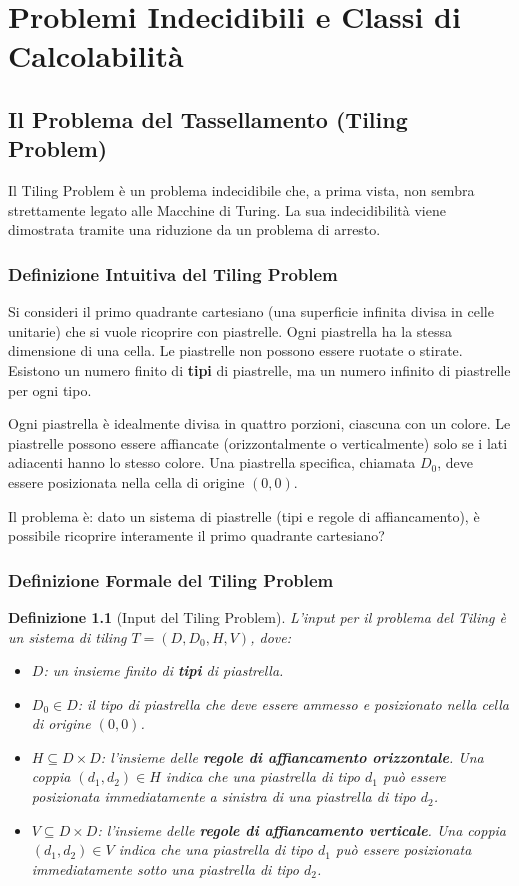 \documentclass[a4paper, 11pt]{book} %
\newtheorem{definition}[theorem]{Definizione}
\theoremstyle{definition}
\begin{document}
\chapter{Problemi Indecidibili e Classi di Calcolabilit\`a}



\section{Il Problema del Tassellamento (Tiling Problem)}

Il Tiling Problem è un problema indecidibile che, a prima vista, non sembra strettamente legato alle Macchine di Turing. La sua indecidibilità viene dimostrata tramite una riduzione da un problema di arresto.

\subsection{Definizione Intuitiva del Tiling Problem}
Si consideri il primo quadrante cartesiano (una superficie infinita divisa in celle unitarie) che si vuole ricoprire con piastrelle. Ogni piastrella ha la stessa dimensione di una cella.
Le piastrelle non possono essere ruotate o stirate. Esistono un numero finito di \textbf{tipi} di piastrelle, ma un numero infinito di piastrelle per ogni tipo.

Ogni piastrella è idealmente divisa in quattro porzioni, ciascuna con un colore. Le piastrelle possono essere affiancate (orizzontalmente o verticalmente) solo se i lati adiacenti hanno lo stesso colore.
Una piastrella specifica, chiamata $D_0$, deve essere posizionata nella cella di origine $(0,0)$.

Il problema è: dato un sistema di piastrelle (tipi e regole di affiancamento), è possibile ricoprire interamente il primo quadrante cartesiano?

\subsection{Definizione Formale del Tiling Problem}
\begin{definition}[Input del Tiling Problem]
L'input per il problema del Tiling è un sistema di tiling $T = (D, D_0, H, V)$, dove:
\begin{itemize}
    \item $D$: un insieme finito di \textbf{tipi} di piastrella.
    \item $D_0 \in D$: il tipo di piastrella che deve essere ammesso e posizionato nella cella di origine $(0,0)$.
    \item $H \subseteq D \times D$: l'insieme delle \textbf{regole di affiancamento orizzontale}. Una coppia $(d_1, d_2) \in H$ indica che una piastrella di tipo $d_1$ può essere posizionata immediatamente a sinistra di una piastrella di tipo $d_2$.
    \item $V \subseteq D \times D$: l'insieme delle \textbf{regole di affiancamento verticale}. Una coppia $(d_1, d_2) \in V$ indica che una piastrella di tipo $d_1$ può essere posizionata immediatamente sotto una piastrella di tipo $d_2$.
\end{itemize}
\end{definition}
\end{document}
